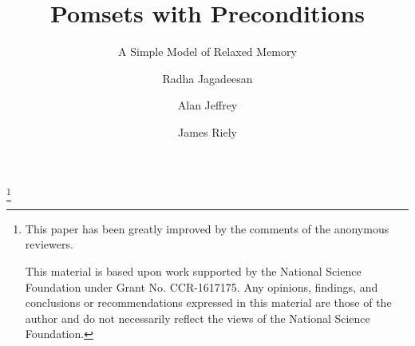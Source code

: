 \documentclass[acmsmall,review,screen]{acmart}\settopmatter{printfolios=true}
\theoremstyle{acmdefinition}
\begin{document}
\title{Pomsets with Preconditions}
\subtitle{A Simple Model of Relaxed Memory}





\author{Radha Jagadeesan}

\author{Alan Jeffrey}

\author{James Riely}


\thanks{
This paper has been greatly improved by the comments of
the anonymous reviewers.

This material is based upon work supported by the National Science Foundation under Grant No. CCR-1617175. Any opinions, findings, and conclusions or
recommendations expressed in this material are those of the author and do not
necessarily reflect the views of the National Science Foundation.}
\end{document}
